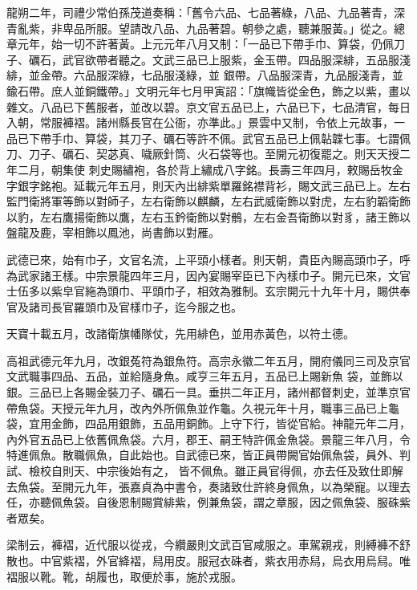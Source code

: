 \begin{pinyinscope}
 龍朔二年，司禮少常伯孫茂道奏稱：「舊令六品、七品著綠，八品、九品著青，深青亂紫，非卑品所服。望請改八品、九品著碧。朝參之處，聽兼服黃。」從之。總章元年，始一切不許著黃。上元元年八月又制：「一品已下帶手巾、算袋，仍佩刀子、礪石，武官欲帶者聽之。文武三品已上服紫，金玉帶。四品服深緋，五品服淺緋，並金帶。六品服深綠，七品服淺綠，並
 銀帶。八品服深青，九品服淺青，並鍮石帶。庶人並銅鐵帶。」文明元年七月甲寅詔：「旗幟皆從金色，飾之以紫，畫以雜文。八品已下舊服者，並改以碧。京文官五品已上，六品已下，七品清官，每日入朝，常服褲褶。諸州縣長官在公衙，亦準此。」景雲中又制，令依上元故事，一品已下帶手巾、算袋，其刀子、礪石等許不佩。武官五品已上佩䪓韘七事。七謂佩刀、刀子、礪石、契苾真、噦厥針筒、火石袋等也。至開元初復罷之。則天天授二年二月，朝集使
 刺史賜繡袍，各於背上繡成八字銘。長壽三年四月，敕賜岳牧金字銀字銘袍。延載元年五月，則天內出緋紫單羅銘襟背衫，賜文武三品已上。左右監門衛將軍等飾以對師子，左右衛飾以麒麟，左右武威衛飾以對虎，左右豹韜衛飾以豹，左右鷹揚衛飾以鷹，左右玉鈐衛飾以對鶻，左右金吾衛飾以對豸，諸王飾以盤龍及鹿，宰相飾以鳳池，尚書飾以對雁。



 武德已來，始有巾子，文官名流，上平頭小樣者。則天朝，貴臣內賜高頭巾子，呼
 為武家諸王樣。中宗景龍四年三月，因內宴賜宰臣已下內樣巾子。開元已來，文官士伍多以紫皁官絁為頭巾、平頭巾子，相效為雅制。玄宗開元十九年十月，賜供奉官及諸司長官羅頭巾及官樣巾子，迄今服之也。



 天寶十載五月，改諸衛旗幡隊仗，先用緋色，並用赤黃色，以符土德。



 高祖武德元年九月，改銀菟符為銀魚符。高宗永徽二年五月，開府儀同三司及京官文武職事四品、五品，並給隨身魚。咸亨三年五月，五品已上賜新魚
 袋，並飾以銀。三品已上各賜金裝刀子、礪石一具。垂拱二年正月，諸州都督刺史，並準京官帶魚袋。天授元年九月，改內外所佩魚並作龜。久視元年十月，職事三品已上龜袋，宜用金飾，四品用銀飾，五品用銅飾。上守下行，皆從官給。神龍元年二月，內外官五品已上依舊佩魚袋。六月，郡王、嗣王特許佩金魚袋。景龍三年八月，令特進佩魚。散職佩魚，自此始也。自武德已來，皆正員帶闕官始佩魚袋，員外、判試、檢校自則天、中宗後始有之，
 皆不佩魚。雖正員官得佩，亦去任及致仕即解去魚袋。至開元九年，張嘉貞為中書令，奏諸致仕許終身佩魚，以為榮寵。以理去任，亦聽佩魚袋。自後恩制賜賞緋紫，例兼魚袋，謂之章服，因之佩魚袋、服硃紫者眾矣。



 梁制云，褲褶，近代服以從戎，今纘嚴則文武百官咸服之。車駕親戎，則縛褲不舒散也。中官紫褶，外官絳褶，舄用皮。服冠衣硃者，紫衣用赤舄，烏衣用烏舄。唯褶服以靴。靴，胡履也，取便於事，施於戎服。




\end{pinyinscope}
